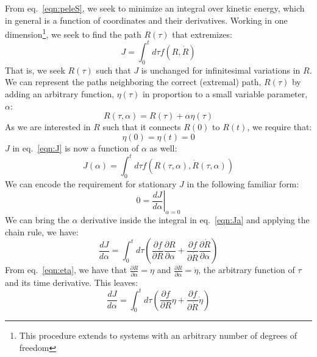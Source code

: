 \documentclass[letterpaper]{tufte-handout}
\newcommand{\laeq}[1]{\label{eqn:#1}}
\renewcommand{\refeq}[1]{eq.~\ref{eqn:#1}}
\renewcommand{\refeq}[1]{eq.~\ref{eqn:#1}}
\begin{document}
From \refeq{peleS}, we seek to minimize an integral over kinetic energy, which in general is a function of coordinates and their derivatives. Working in one dimension\footnote{This procedure extends to systems with an arbitrary number of degrees of freedom}, we seek to find the path $R(\tau)$ that extremizes:
\begin{equation}\laeq{J}
  J = \int_{0}^{t}d\tau f \left(R, \dot{R} \right)
\end{equation}
That is, we seek $R(\tau)$ such that $J$ is unchanged for infinitesimal variations in $R$. We can represent the paths neighboring the correct (extremal) path, $R(\tau)$ by adding an arbitrary function, $\eta(\tau)$ in proportion to a small variable parameter, $\alpha$:
\begin{equation}\laeq{eta}
  R(\tau,\alpha) = R(\tau) + \alpha\eta(\tau)
\end{equation}
As we are interested in $R$ such that it connects $R(0)$ to $R(t)$, we require that:
\begin{equation}\laeq{eta:bounds}
  \eta(0)=\eta(t)=0
\end{equation}
$J$ in \refeq{J} is now a function of $\alpha$ as well:
\begin{equation}\laeq{Ja}
  J(\alpha) = \int_{0}^{t}d\tau f \left(R(\tau,\alpha), \dot{R}(\tau, \alpha) \right)
\end{equation}
We can encode the requirement for stationary $J$ in the following familiar form:
\begin{equation}
  0 = {\left. \frac{d J}{d \alpha} \right|}_{\alpha=0}
\end{equation}
We can bring the $\alpha$ derivative inside the integral in \refeq{Ja} and applying the chain rule, we have:
\begin{equation*}
  \frac{d J}{d \alpha} = \int_{0}^{t}d\tau \left( \frac{\partial f}{\partial R}\frac{\partial R}{\partial \alpha} + \frac{\partial f}{\partial \dot{R}}\frac{\partial \dot{R}}{\partial \alpha} \right)
\end{equation*}
From \refeq{eta}, we have that $\frac{\partial R}{\partial \alpha} = \eta$ and $\frac{\partial \dot{R}}{\partial \alpha} = \dot{\eta}$, the arbitrary function of $\tau$ and its time derivative. This leaves:
\begin{equation}\laeq{J:1}
  \frac{d J}{d \alpha} = \int_{0}^{t}d\tau \left( \frac{\partial f}{\partial R}\eta + \frac{\partial f}{\partial \dot{R}} \dot{\eta} \right)
\end{equation}
\end{document}
